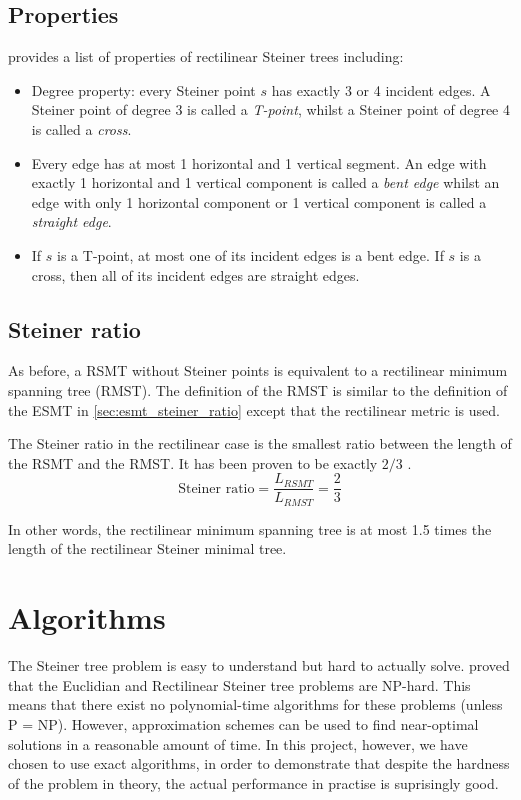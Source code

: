 \documentclass{l4proj}
\begin{document}
\subsection{Properties}
\cite{Brazil2015} provides a list of properties of rectilinear Steiner trees including:
\begin{itemize}
    \item Degree property: every Steiner point $s$ has exactly 3 or 4 incident edges. A Steiner point of degree 3 is called a \textit{T-point}, whilst a Steiner point of degree 4 is called a \textit{cross}.
    \item Every edge has at most 1 horizontal and 1 vertical segment. An edge with exactly 1 horizontal and 1 vertical component is called a \textit{bent edge} whilst an edge with only 1 horizontal component or 1 vertical component is called a \textit{straight edge}.
    \item If $s$ is a T-point, at most one of its incident edges is a bent edge. If $s$ is a cross, then all of its incident edges are straight edges.
\end{itemize}

\subsection{Steiner ratio}
As before, a RSMT without Steiner points is equivalent to a rectilinear minimum spanning tree (RMST). The definition of the RMST is similar to the definition of the ESMT in \ref{sec:esmt_steiner_ratio} except that the rectilinear metric is used.

The Steiner ratio in the rectilinear case is the smallest ratio between the length of the RSMT and the RMST. It has been proven to be exactly $2/3$ \cite{Brazil2015}.
$$
    \text{Steiner ratio} = \frac{L_{RSMT}}{L_{RMST}} = \frac{2}{3}
$$

In other words, the rectilinear minimum spanning tree is at most 1.5 times the length of the rectilinear Steiner minimal tree.

\section{Algorithms}
The Steiner tree problem is easy to understand but hard to actually solve. \cite{Garey1977} proved that the Euclidian and Rectilinear Steiner tree problems are NP-hard. This means that there exist no polynomial-time algorithms for these problems (unless P = NP).
However, approximation schemes can be used to find near-optimal solutions in a reasonable amount of time. In this project, however, we have chosen to use exact algorithms, in order to demonstrate that despite the hardness of the problem in theory, the actual performance in practise is suprisingly good.
\end{document}

